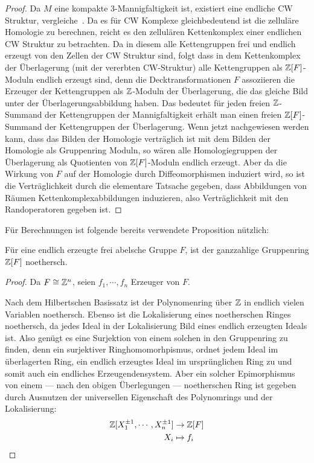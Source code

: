 	\begin{proof}
	Da $M$ eine kompakte 3-Mannigfaltigkeit ist, existiert eine endliche CW Struktur, vergleiche~\cite{Moise.1952}. Da es für CW Komplexe gleichbedeutend ist die zelluläre Homologie zu berechnen, reicht es den zellulären Kettenkomplex einer endlichen CW Struktur zu betrachten. Da in diesem alle Kettengruppen frei und endlich erzeugt von den Zellen der CW Struktur sind, folgt dass in dem Kettenkomplex der Überlagerung (mit der vererbten CW-Struktur) alle Kettengruppen als $\mathbb{Z}[F]$-Moduln endlich erzeugt sind, denn die Decktransformationen $F$ assoziieren die Erzeuger der Kettengruppen als $\mathbb{Z}$-Moduln der Überlagerung, die das gleiche Bild unter der Überlagerungsabbildung haben. Das bedeutet für jeden freien $\mathbb{Z}$-Summand der Kettengruppen der Mannigfaltigkeit erhält man einen freien $\mathbb{Z}[F]$-Summand der Kettengruppen der Überlagerung. Wenn jetzt nachgewiesen werden kann, dass das Bilden der Homologie verträglich ist mit dem Bilden der Homologie als Gruppenring Moduln, so wären alle Homologiegruppen der Überlagerung als Quotienten von $\mathbb{Z}[F]$-Moduln endlich erzeugt. Aber da die Wirkung von $F$ auf der Homologie durch Diffeomorphismen induziert wird, so ist die Verträglichkeit durch die elementare Tatsache gegeben, dass Abbildungen von Räumen Kettenkomplexabbildungen induzieren, also Verträglichkeit mit den Randoperatoren gegeben ist.
\end{proof}

Für Berechnungen ist folgende bereits verwendete Proposition nützlich:
\begin{prop}
	Für eine endlich erzeugte frei abelsche Gruppe $F$, ist der ganzzahlige Gruppenring $\mathbb{Z}[F]$ noethersch.
\end{prop}
\begin{proof}
	Da $F\cong \mathbb{Z}^n$, seien $f_1,\cdots,f_n$ Erzeuger von $F$.

	Nach dem Hilbertschen Basissatz ist der Polynomenring über $\mathbb{Z}$ in endlich vielen Variablen noethersch. Ebenso ist die Lokalisierung eines noetherschen Ringes noethersch, da jedes Ideal in der Lokalisierung Bild eines endlich erzeugten Ideals ist. Also genügt es eine Surjektion von einem solchen in den Gruppenring zu finden, denn ein surjektiver Ringhomomorhpismus, ordnet jedem Ideal im überlagerten Ring, ein endlich erzeugtes Ideal im ursprünglichen Ring zu und somit auch ein endliches Erzeugendensystem. Aber ein solcher Epimorphismus von einem --- nach den obigen Überlegungen --- noetherschen Ring ist gegeben durch Ausnutzen der universellen Eigenschaft des Polynomrings und der Lokalisierung:
	\begin{align*}
			\mathbb{Z}[X_1^{\pm 1},\cdots,X_{n}^{\pm 1}] & \to  \mathbb{Z}[F]\\
			X_i &\mapsto  f_i
	\end{align*}
\end{proof}

